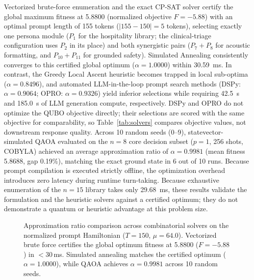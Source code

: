 \documentclass[review,12pt,times,authoryear]{elsarticle}
\theoremstyle{definition}
\begin{document}
Vectorized brute-force enumeration and the exact CP-SAT solver certify the global maximum fitness at 5.8800 (normalized objective $F = -5.88$) with an optimal prompt length of 155 tokens ($|155 - 150| = 5$ tokens), selecting exactly one persona module ($P_1$ for the hospitality library; the clinical-triage configuration uses $P_2$ in its place) and both synergistic pairs ($P_7+P_8$ for acoustic formatting, and $P_{10}+P_{11}$ for grounded safety). Simulated Annealing consistently converges to this certified global optimum ($\alpha = 1.0000$) within \SI{30.59}{\milli\second}. In contrast, the Greedy Local Ascent heuristic becomes trapped in local sub-optima ($\alpha = 0.8496$), and automated LLM-in-the-loop prompt search methods (DSPy: $\alpha = 0.9064$; OPRO: $\alpha = 0.9326$) yield inferior selections while requiring \SI{42.5}{\second} and \SI{185.0}{\second} of LLM generation compute, respectively. DSPy and OPRO do not optimize the QUBO objective directly; their selections are scored with the same objective for comparability, so Table~\ref{tab:solvers} compares objective values, not downstream response quality. Across 10 random seeds (0--9), statevector-simulated QAOA evaluated on the $n=8$ core decision subset ($p=1$, 256 shots, COBYLA) achieved an average approximation ratio of $\alpha = 0.9981$ (mean fitness 5.8688, gap 0.19\%), matching the exact ground state in 6 out of 10 runs. Because prompt compilation is executed strictly offline, the optimization overhead introduces zero latency during runtime turn-taking. Because exhaustive enumeration of the $n=15$ library takes only \SI{29.68}{\milli\second}, these results validate the formulation and the heuristic solvers against a certified optimum; they do not demonstrate a quantum or heuristic advantage at this problem size.

\begin{figure}[t]
\centering
{}
\caption{Approximation ratio comparison across combinatorial solvers on the normalized prompt Hamiltonian ($T=150$, $\mu=64.0$). Vectorized brute force certifies the global optimum fitness at 5.8800 ($F = -5.88$) in $<30$\,ms. Simulated annealing matches the certified optimum ($\alpha = 1.0000$), while QAOA achieves $\alpha = 0.9981$ across 10 random seeds.}
\label{fig:solver_approx_ratio}
\end{figure}
\end{document}
